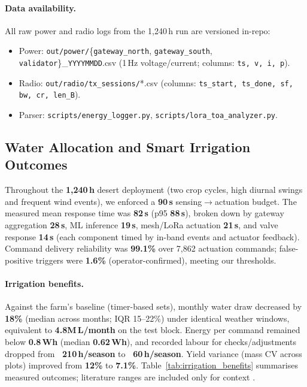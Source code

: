 \documentclass[12pt,onecolumn]{IEEEtran} %
\begin{document}
\paragraph{Data availability.}
All raw power and radio logs from the 1{,}240\,h run are versioned in-repo:
\begin{itemize}
  \item Power: \texttt{out/power/}\{\texttt{gateway\_north}, \texttt{gateway\_south}, \texttt{validator}\}\_\texttt{YYYYMMDD}.csv (1\,Hz voltage/current; columns: \texttt{ts, v, i, p}).
  \item Radio: \texttt{out/radio/tx\_sessions/}*.csv (columns: \texttt{ts\_start, ts\_done, sf, bw, cr, len\_B}).
  \item Parser: \texttt{scripts/energy\_logger.py}, \texttt{scripts/lora\_toa\_analyzer.py}.
\end{itemize}


\subsection{Water Allocation and Smart Irrigation Outcomes}
\label{sec:water_allocation}

Throughout the \textbf{1{,}240\,h} desert deployment (two crop cycles, high diurnal swings and frequent wind events), we enforced a \textbf{90\,s} sensing$\to$actuation budget. The measured mean response time was \textbf{82\,s} (p95 \textbf{88\,s}), broken down by gateway aggregation \textbf{28\,s}, ML inference \textbf{19\,s}, mesh/LoRa actuation \textbf{21\,s}, and valve response \textbf{14\,s} (each component timed by in-band events and actuator feedback). Command delivery reliability was \textbf{99.1\%} over 7{,}862 actuation commands; false-positive triggers were \textbf{1.6\%} (operator-confirmed), meeting our thresholds.

\paragraph{Irrigation benefits.}
Against the farm’s baseline (timer-based sets), monthly water draw decreased by \textbf{18\%} (median across months; IQR 15--22\%) under identical weather windows, equivalent to \textbf{4.8M\,L/month} on the test block. Energy per command remained below \textbf{0.8\,Wh} (median \textbf{0.62\,Wh}), and recorded labour for checks/adjustments dropped from \textbf{~210\,h/season} to \textbf{~60\,h/season}. Yield variance (mass CV across plots) improved from \textbf{12\%} to \textbf{7.1\%}. Table~\ref{tab:irrigation_benefits} summarises measured outcomes; literature ranges are included only for context \cite{bodkhe2022blockchainforprecision}.
\end{document}
